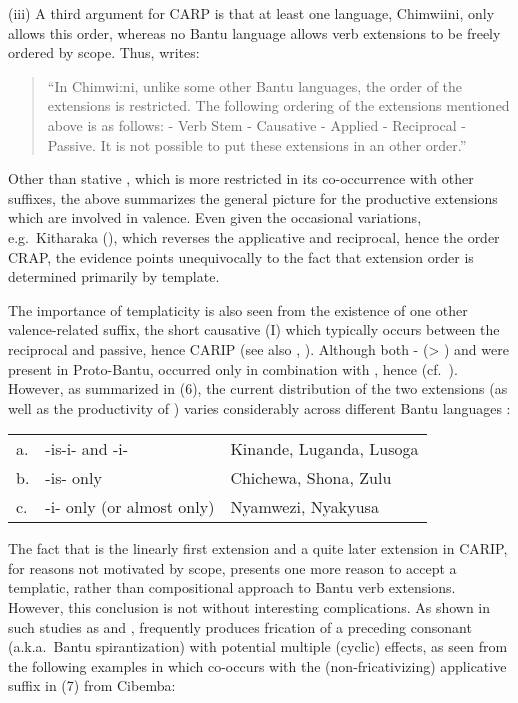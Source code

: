 \documentclass[output=paper,
modfonts
]{LSP/langsci}
\begin{document}
(iii) A third argument for CARP is that at least one language,
Chimwiini, only allows this order, whereas no Bantu language allows verb
extensions to be freely ordered by scope. Thus, \citet[28]{abasheikh1978}
writes:

\begin{quote}
``In Chimwi:ni, unlike some other Bantu languages, the order of the
extensions is restricted. The following ordering of the extensions
mentioned above is as follows: - Verb Stem - Causative - Applied -
Reciprocal - Passive. It is not possible to put these extensions in an
other order.''
\end{quote}

\noindent Other than stative , which is more restricted in its
co-occurrence with other suffixes, the above summarizes the general
picture for the productive extensions which are involved in valence.
Even given the occasional variations, e.g.\ Kitharaka (\citet{muriungi2003}),
which reverses the applicative and reciprocal, hence the order CRAP, the
evidence points unequivocally to the fact that extension order is
determined primarily by template.

The importance of templaticity is also seen from the existence of one
other valence-related suffix, the short causative  (I) which
typically occurs between the reciprocal and passive, hence CARIP (see
also \citet{bastin1986}, \citet{good2005}). Although both - (\textgreater{}
) and  were present in Proto-Bantu,
 occurred only in combination with , hence
 (cf.\ \citet{bastin1986}). However, as summarized in (6), the
current distribution of the two extensions (as well as the productivity
of ) varies considerably across different Bantu languages
\citep[261]{hyman2003}:

\ea \begin{tabular}[t]{@{}ll@{ : }l}
a. & -is-i- and -i- & Kinande, Luganda, Lusoga\\
b. & -is- only       & Chichewa, Shona, Zulu\\
c. &  -i- only (or almost only) & Nyamwezi, Nyakyusa\\
\end{tabular}
\z

\noindent The fact that  is the linearly first extension and 
a quite later extension in CARIP, for reasons not motivated by scope,
presents one more reason to accept a templatic, rather than
compositional approach to Bantu verb extensions. However, this
conclusion is not without interesting complications. As shown in such
studies as \citet{hyman1994,hyman2003c} and \citet{downing2005j},  frequently
produces frication of a preceding consonant (a.k.a.\ Bantu
spirantization) with potential multiple (cyclic) effects, as seen from
the following examples in which  co-occurs with the
(non-fricativizing) applicative  suffix in (7) from Cibemba:
\end{document}
